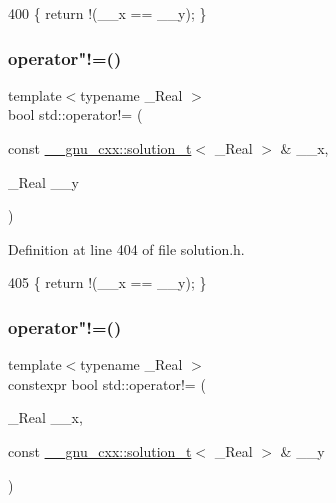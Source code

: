 \begin{DoxyCode}
400     \{ \textcolor{keywordflow}{return} !(\_\_x == \_\_y); \}
\end{DoxyCode}
\mbox{\label{namespacestd_a88548a06c4013d8e23c70a25a48a8929}} 
\subsubsection{\texorpdfstring{operator"!=()}{operator!=()}\hspace{0.1cm}{\footnotesize\ttfamily [2/5]}}
{\footnotesize\ttfamily template$<$typename \+\_\+\+Real $>$ \\
bool std\+::operator!= (\begin{DoxyParamCaption}\item[{const \hyperlink{namespace____gnu__cxx_ae20ea642de50eb361074c62676b0159c}{\+\_\+\+\_\+gnu\+\_\+cxx\+::solution\+\_\+t}$<$ \+\_\+\+Real $>$ \&}]{\+\_\+\+\_\+x,  }\item[{\+\_\+\+Real}]{\+\_\+\+\_\+y }\end{DoxyParamCaption})}



Definition at line 404 of file solution.\+h.


\begin{DoxyCode}
405     \{ \textcolor{keywordflow}{return} !(\_\_x == \_\_y); \}
\end{DoxyCode}
\mbox{\label{namespacestd_ac8ab440760f8eab57232be8417861387}} 
\subsubsection{\texorpdfstring{operator"!=()}{operator!=()}\hspace{0.1cm}{\footnotesize\ttfamily [3/5]}}
{\footnotesize\ttfamily template$<$typename \+\_\+\+Real $>$ \\
constexpr bool std\+::operator!= (\begin{DoxyParamCaption}\item[{\+\_\+\+Real}]{\+\_\+\+\_\+x,  }\item[{const \hyperlink{namespace____gnu__cxx_ae20ea642de50eb361074c62676b0159c}{\+\_\+\+\_\+gnu\+\_\+cxx\+::solution\+\_\+t}$<$ \+\_\+\+Real $>$ \&}]{\+\_\+\+\_\+y }\end{DoxyParamCaption})}



